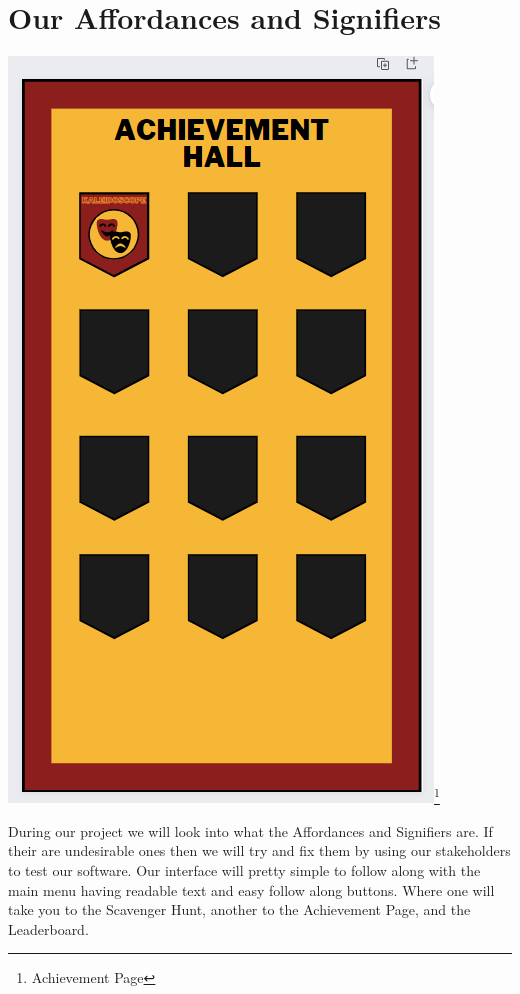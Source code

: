 \documentclass[twoside,twocolumn]{article}
\begin{document}

\section{Our Affordances and Signifiers}
\includegraphics[scale=0.25]{Achievements/Achievement_Page.png}\footnote{Achievement Page}
\par During our project we will look into what the Affordances and Signifiers are. If their are undesirable ones then we will try and fix them by using our stakeholders to test our software. Our interface will pretty simple to follow along with the main menu having readable text and easy follow along buttons. Where one will take you to the Scavenger Hunt, another to the Achievement Page, and the Leaderboard.
\end{document}
